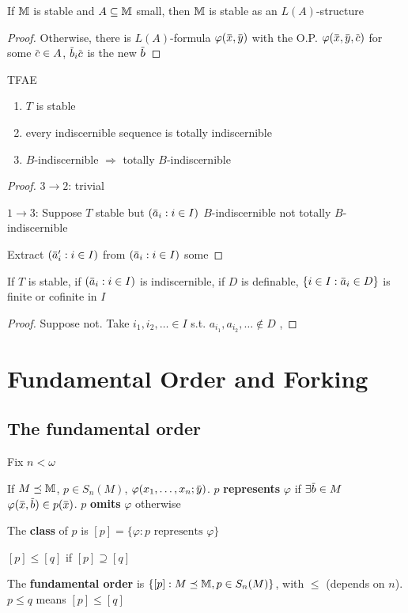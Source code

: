 \documentclass[11pt]{article}
\begin{document}
\begin{proposition}[]
If \(\mathbb{M}\) is stable and \(A\subseteq\mathbb{M}\) small, then \(\mathbb{M}\) is stable as an \(L(A)\)-structure
\end{proposition}

\begin{proof}
Otherwise, there is \(L(A)\)-formula \(\varphi(\barx,\bary)\) with the O.P.
\(\varphi(\barx,\bary,\barc)\) for some \(\barc\in A\), \(\barb_i\barc\) is the new \(\barb\)
\end{proof}

\begin{theorem}[]
TFAE
\begin{enumerate}
\item \(T\) is stable
\item every indiscernible sequence is totally indiscernible
\item \(B\)-indiscernible \(\Rightarrow\) totally \(B\)-indiscernible
\end{enumerate}
\end{theorem}

\begin{proof}
\(3\to 2\): trivial

\(1\to 3\): Suppose \(T\) stable but \((\bara_i:i\in I)\) \(B\)-indiscernible not
totally \(B\)-indiscernible

Extract \((\bara_i':i\in I)\) from \((\bara_i:i\in I)\) some
\end{proof}

\begin{corollary}[]
If \(T\) is stable, if \((\bara_i:i\in I)\) is indiscernible, if \(D\) is
definable, \(\{i\in I:\bara_i\in D\}\) is finite or cofinite in \(I\)
\end{corollary}

\begin{proof}
Suppose not. Take \(i_1,i_2,\dots\in I\) s.t. \(a_{i_1},a_{i_2},\dots\notin D\) , 
\end{proof}


\section{Fundamental Order and Forking}
\label{sec:org54659f4}
\subsection{The fundamental order}
\label{sec:org75a78c2}
Fix \(n<\omega\)
\begin{definition}[]
If \(M\preceq\mathbb{M}\), \(p\in S_n(M)\), \(\varphi(x_1,\dots,x_n;\bary)\). \(p\) \textbf{represents} \(\varphi\)
if \(\exists\barb\in M\) \(\varphi(\barx,\barb)\in p(\barx)\). \(p\) \textbf{omits} \(\varphi\) otherwise

The \textbf{class} of \(p\) is \([p]=\{\varphi:p\text{ represents }\varphi\}\)

\([p]\le[q]\) if \([p]\supseteq[q]\)

The \textbf{fundamental order} is \(\{[p]:M\preceq\mathbb{M},p\in S_n(M)\}\), with \(\le\) (depends on \(n\)). \(p\le q\) means \([p]\le[q]\)
\end{definition}
\end{document}

